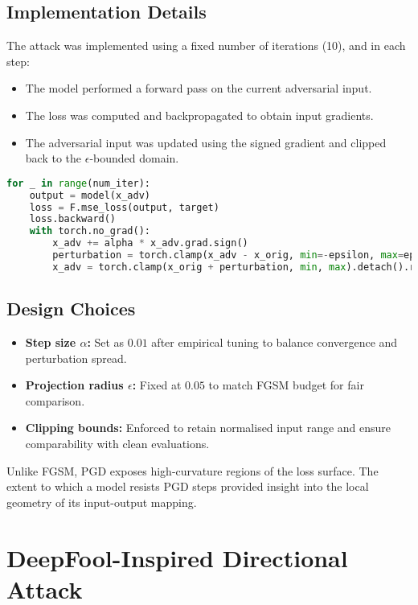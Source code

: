 \subsection*{Implementation Details}
The attack was implemented using a fixed number of iterations (10), and in each step:
\begin{itemize}
    \item The model performed a forward pass on the current adversarial input.
    \item The loss was computed and backpropagated to obtain input gradients.
    \item The adversarial input was updated using the signed gradient and clipped back to the $\epsilon$-bounded domain.
\end{itemize}

\begin{lstlisting}[language=Python, caption={PGD Attack Loop (Simplified)}]
for _ in range(num_iter):
    output = model(x_adv)
    loss = F.mse_loss(output, target)
    loss.backward()
    with torch.no_grad():
        x_adv += alpha * x_adv.grad.sign()
        perturbation = torch.clamp(x_adv - x_orig, min=-epsilon, max=epsilon)
        x_adv = torch.clamp(x_orig + perturbation, min, max).detach().requires_grad_()
\end{lstlisting}


\subsection*{Design Choices}
\begin{itemize}
    \item \textbf{Step size $\alpha$:} Set as $0.01$ after empirical tuning to balance convergence and perturbation spread.
    \item \textbf{Projection radius $\epsilon$:} Fixed at $0.05$ to match FGSM budget for fair comparison.
    \item \textbf{Clipping bounds:} Enforced to retain normalised input range and ensure comparability with clean evaluations.
\end{itemize}

Unlike FGSM, PGD exposes high-curvature regions of the loss surface. The extent to which a model resists PGD steps provided insight into the local geometry of its input-output mapping.

\section{DeepFool-Inspired Directional Attack}

